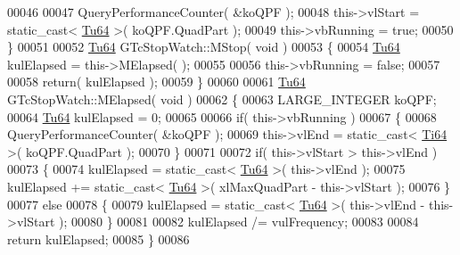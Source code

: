 \begin{DoxyCode}
00046 
00047    QueryPerformanceCounter( &koQPF ); 
00048    this->vlStart   = \textcolor{keyword}{static\_cast<} \mbox{\hyperlink{namespace_g_n_common_a9404ee6090c788ae70aebd1436ceb97d}{Tu64}} \textcolor{keyword}{>}( koQPF.QuadPart );
00049    this->vbRunning = \textcolor{keyword}{true};
00050 \}
00051 
00052 \mbox{\hyperlink{namespace_g_n_common_a9404ee6090c788ae70aebd1436ceb97d}{Tu64}} GTcStopWatch::MStop( \textcolor{keywordtype}{void} )
00053 \{
00054    \mbox{\hyperlink{namespace_g_n_common_a9404ee6090c788ae70aebd1436ceb97d}{Tu64}} kulElapsed = this->MElapsed( );
00055 
00056    this->vbRunning = \textcolor{keyword}{false};
00057 
00058    \textcolor{keywordflow}{return}( kulElapsed );
00059 \}
00060 
00061 \mbox{\hyperlink{namespace_g_n_common_a9404ee6090c788ae70aebd1436ceb97d}{Tu64}} GTcStopWatch::MElapsed( \textcolor{keywordtype}{void} )
00062 \{
00063    LARGE\_INTEGER koQPF;
00064    \mbox{\hyperlink{namespace_g_n_common_a9404ee6090c788ae70aebd1436ceb97d}{Tu64}}         kulElapsed = 0;
00065 
00066    \textcolor{keywordflow}{if}( this->vbRunning )
00067    \{
00068       QueryPerformanceCounter( &koQPF );
00069       this->vlEnd = \textcolor{keyword}{static\_cast<} \mbox{\hyperlink{namespace_g_n_common_ad0a34f67eefe81cfbd0e515bba246d9d}{Ti64}} \textcolor{keyword}{>}( koQPF.QuadPart );
00070    \}
00071 
00072    \textcolor{keywordflow}{if}( this->vlStart > this->vlEnd )
00073    \{
00074       kulElapsed =  \textcolor{keyword}{static\_cast<} \mbox{\hyperlink{namespace_g_n_common_a9404ee6090c788ae70aebd1436ceb97d}{Tu64}} \textcolor{keyword}{>}( this->vlEnd );
00075       kulElapsed += \textcolor{keyword}{static\_cast<} \mbox{\hyperlink{namespace_g_n_common_a9404ee6090c788ae70aebd1436ceb97d}{Tu64}} \textcolor{keyword}{>}( xlMaxQuadPart - this->vlStart );
00076    \}
00077    \textcolor{keywordflow}{else}
00078    \{
00079       kulElapsed = \textcolor{keyword}{static\_cast<} \mbox{\hyperlink{namespace_g_n_common_a9404ee6090c788ae70aebd1436ceb97d}{Tu64}} \textcolor{keyword}{>}( this->vlEnd - this->vlStart );
00080    \}
00081 
00082    kulElapsed /= vulFrequency;
00083 
00084    \textcolor{keywordflow}{return} kulElapsed;
00085 \}
00086 
\end{DoxyCode}
